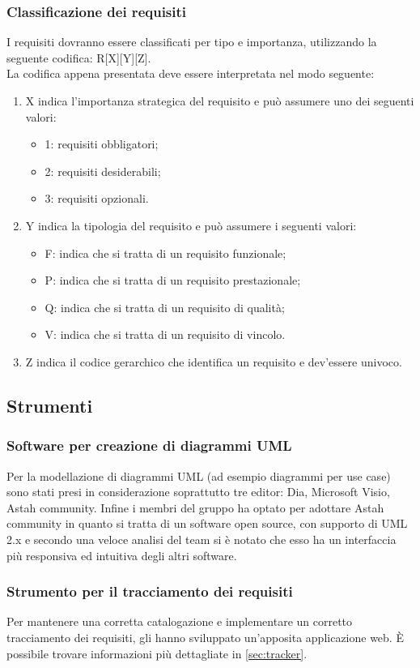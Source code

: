 			\subsubsection{Classificazione dei requisiti}
				I requisiti dovranno essere classificati per tipo e importanza, utilizzando la seguente codifica: R[X][Y][Z].\\
				La codifica appena presentata deve essere interpretata nel modo seguente:
				\begin{enumerate}
					\item X indica l'importanza strategica del requisito e può assumere uno dei seguenti valori:
					\begin{itemize}
						\item 1: requisiti obbligatori;
						\item 2: requisiti desiderabili;
						\item 3: requisiti opzionali.
					\end{itemize}
					\item Y indica la tipologia del requisito e può assumere i seguenti valori:
					\begin{itemize}
						\item F: indica che si tratta di un requisito funzionale;
						\item P: indica che si tratta di un requisito prestazionale;
						\item Q: indica che si tratta di un requisito di qualità;
						\item V: indica che si tratta di un requisito di vincolo.
					\end{itemize}
					\item Z indica il codice gerarchico che identifica un requisito e dev'essere univoco.
				\end{enumerate}
		\subsection{Strumenti}
			\subsubsection{Software per creazione di diagrammi UML}
			Per la modellazione di diagrammi UML (ad esempio diagrammi per use case) sono stati presi in considerazione soprattutto tre editor: Dia, Microsoft Visio, Astah community. Infine i membri del gruppo \groupname{} ha optato per adottare Astah community in quanto si tratta di un software open source, con supporto di UML 2.x e secondo una veloce analisi del team si è notato che esso ha un interfaccia più responsiva ed intuitiva degli altri software.
			\subsubsection{Strumento per il tracciamento dei requisiti}
			Per mantenere una corretta catalogazione e implementare un corretto tracciamento dei requisiti, gli  hanno sviluppato un'apposita applicazione web. È possibile trovare informazioni più dettagliate in \autoref{sec:tracker}.
